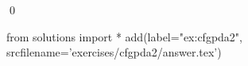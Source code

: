 
\begin{ex} 
  \label{ex:cfgpda2}
  
  \qed
\end{ex} 
\begin{python0}
from solutions import *
add(label="ex:cfgpda2",
    srcfilename='exercises/cfgpda2/answer.tex') 
\end{python0}
